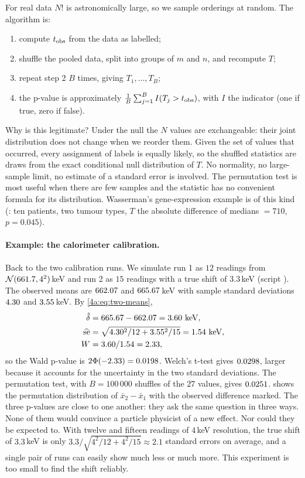 For real data $N!$ is astronomically large, so we sample orderings at random.
The algorithm  is:
\begin{enumerate}[label=\arabic*.]
  \item compute $t_{\rm obs}$ from the data as labelled;
  \item shuffle the pooled data, split into groups of $m$ and $n$, and
        recompute $T$;
  \item repeat step 2 $B$ times, giving $T_1,\dots,T_B$;
  \item the p-value is approximately $\frac1B\sum_{j=1}^B I(T_j>t_{\rm obs})$,
        with $I$ the indicator (one if true, zero if false).
\end{enumerate}
Why is this legitimate? Under the null the $N$ values are exchangeable: their
joint distribution does not change when we reorder them. Given the set of
values that occurred, every assignment of labels is equally likely, so the
shuffled statistics are draws from the exact conditional null distribution of
$T$. No normality, no large-sample limit, no estimate of a standard error is
involved. The permutation test is most useful when there are few samples and
the statistic has no convenient formula for its distribution. Wasserman's
gene-expression example is of this kind (: ten patients,
two tumour types, $T$ the absolute difference of medians $=710$,
$p=0.045$).

\paragraph{Example: the calorimeter calibration.}
Back to the two calibration runs. We simulate run 1 as $12$ readings
from $\mathcal{N}(661.7,4^2)\,$keV and run 2 as $15$ readings with a true shift of
$3.3\,$keV (script ). The observed means are $662.07$ and $665.67\,$keV
with sample standard deviations $4.30$ and $3.55\,$keV.
By \eqref{4a:eq:two-means},
\begin{align*}
  \hat\delta &= \FourACalMeanTwo-\FourACalMeanOne=\FourACalD\ \text{keV},\\
  \widehat{\rm se} &= \sqrt{\FourACalSdOne^2/12+\FourACalSdTwo^2/15}=\FourACalSe\ \text{keV},\\
  W &= \FourACalD/\FourACalSe=\FourACalW ,
\end{align*}
so the Wald p-value is $2\Phi(-2.33)=0.0198$. Welch's t-test gives
$0.0298$, larger because it accounts for the uncertainty in the two
standard deviations. The permutation test, with $B=100\,000$ shuffles of the
$27$ values, gives $0.0251$.  shows the
permutation distribution of $\bar x_2-\bar x_1$ with the observed difference
marked. The three p-values are close to one another: they ask the same question
in three ways. None of them would convince a particle physicist of a new effect.
Nor could they be expected to. With twelve and fifteen readings of $4\,$keV
resolution, the true shift of $3.3\,$keV is only
$3.3/\sqrt{4^2/12+4^2/15}\approx2.1$ standard errors on average, and a single pair
of runs can easily show much less or much more. This experiment is too small to
find the shift reliably.

